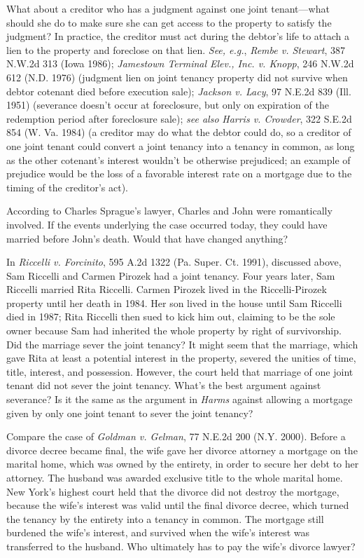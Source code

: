 What about a creditor who has a judgment against one joint tenant---what should
she do to make sure she can get access to the property to satisfy the judgment?
In practice, the creditor must act during the debtor's life to attach a lien to
the property and foreclose on that lien. \textit{See, e.g.}, \emph{Rembe v.
Stewart}, 387 N.W.2d 313 (Iowa 1986); \emph{Jamestown Terminal Elev., Inc. v.
Knopp}, 246 N.W.2d 612 (N.D. 1976) (judgment lien on joint tenancy property did
not survive when debtor cotenant died before execution sale); \emph{Jackson v.
Lacy}, 97 N.E.2d 839 (Ill. 1951) (severance doesn't occur at foreclosure, but
only on expiration of the redemption period after foreclosure sale); \textit{see
also} \emph{Harris v. Crowder}, 322 S.E.2d 854 (W. Va. 1984) (a creditor may do
what the debtor could do, so a creditor of one joint tenant could convert a
joint tenancy into a tenancy in common, as long as the other cotenant's interest
wouldn't be otherwise prejudiced; an example of prejudice would be the loss of a
favorable interest rate on a mortgage due to the timing of the creditor's act).



\item According to Charles Sprague's lawyer, Charles and John were romantically
involved. If the events underlying the case occurred today, they could have
married before John's death. Would that have changed anything?


In \emph{Riccelli v. Forcinito}, 595 A.2d 1322 (Pa. Super. Ct. 1991), discussed
above, Sam Riccelli and Carmen Pirozek had a joint tenancy. Four years later,
Sam Riccelli married Rita Riccelli. Carmen Pirozek lived in the Riccelli-Pirozek
property until her death in 1984. Her son lived in the house until Sam Riccelli
died in 1987; Rita Riccelli then sued to kick him out, claiming to be the sole
owner because Sam had inherited the whole property by right of survivorship. Did
the marriage sever the joint tenancy? It might seem that the marriage, which
gave Rita at least a potential interest in the property, severed the unities of
time, title, interest, and possession. However, the court held that marriage of
one joint tenant did not sever the joint tenancy. What's the best argument
against severance? Is it the same as the argument in \textit{Harms} against
allowing a mortgage given by only one joint tenant to sever the joint tenancy?



Compare the case of \textit{Goldman v. Gelman}, 77 N.E.2d 200 (N.Y. 2000).
Before a divorce decree became final, the wife gave her divorce attorney a
mortgage on the marital home, which was owned by the entirety, in order to
secure her debt to her attorney. The husband was awarded exclusive title to
the whole marital home. New York's highest court held that the divorce did not
destroy the mortgage, because the wife's interest was valid until the final
divorce decree, which turned the tenancy by the entirety into a tenancy in
common. The mortgage still burdened the wife's interest, and survived when the
wife's interest was transferred to the husband. Who ultimately has to pay the
wife's divorce lawyer?



